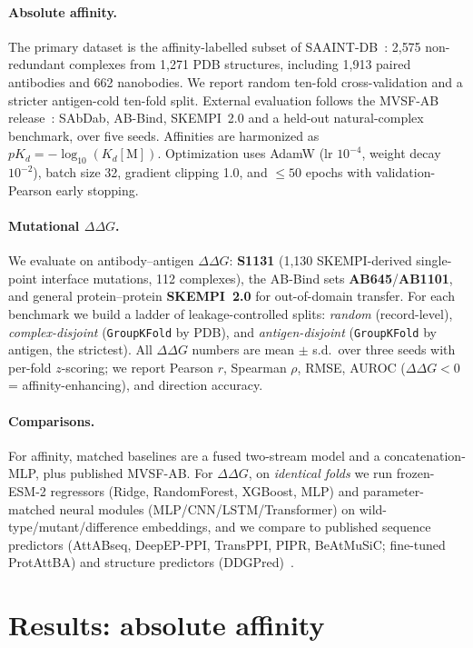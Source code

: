 \documentclass{article}
\newcommand{\ddg}{\ensuremath{\Delta\Delta G}}
\newcommand{\pkd}{\ensuremath{pK_d}}
\begin{document}
\paragraph{Absolute affinity.}
The primary dataset is the affinity-labelled subset of SAAINT-DB~\citep{huang2025saaint}: 2{,}575 non-redundant complexes from 1{,}271 PDB structures, including 1{,}913 paired antibodies and 662 nanobodies. We report random ten-fold cross-validation and a stricter antigen-cold ten-fold split. External evaluation follows the MVSF-AB release~\citep{li2025mvsf}: SAbDab, AB-Bind, SKEMPI~2.0 and a held-out natural-complex benchmark, over five seeds. Affinities are harmonized as $\pkd=-\log_{10}(K_d[\mathrm M])$. Optimization uses AdamW (lr $10^{-4}$, weight decay $10^{-2}$), batch size 32, gradient clipping 1.0, and $\leq50$ epochs with validation-Pearson early stopping.

\paragraph{Mutational \ddg{}.}
We evaluate on antibody--antigen \ddg{}: \textbf{S1131} (1{,}130 SKEMPI-derived single-point interface mutations, 112 complexes), the AB-Bind sets \textbf{AB645}/\textbf{AB1101}, and general protein--protein \textbf{SKEMPI~2.0} for out-of-domain transfer. For each benchmark we build a ladder of leakage-controlled splits: \emph{random} (record-level), \emph{complex-disjoint} (\texttt{GroupKFold} by PDB), and \emph{antigen-disjoint} (\texttt{GroupKFold} by antigen, the strictest). All \ddg{} numbers are mean $\pm$ s.d.\ over three seeds with per-fold $z$-scoring; we report Pearson $r$, Spearman $\rho$, RMSE, AUROC ($\ddg<0$ = affinity-enhancing), and direction accuracy.

\paragraph{Comparisons.}
For affinity, matched baselines are a fused two-stream model and a concatenation-MLP, plus published MVSF-AB. For \ddg{}, on \emph{identical folds} we run frozen-ESM-2 regressors (Ridge, RandomForest, XGBoost, MLP) and parameter-matched neural modules (MLP/CNN/LSTM/Transformer) on wild-type/mutant/difference embeddings, and we compare to published sequence predictors (AttABseq, DeepEP-PPI, TransPPI, PIPR, BeAtMuSiC; fine-tuned ProtAttBA) and structure predictors (DDGPred)~\citep{jin2024attabseq}.

\section{Results: absolute affinity}
\end{document}
